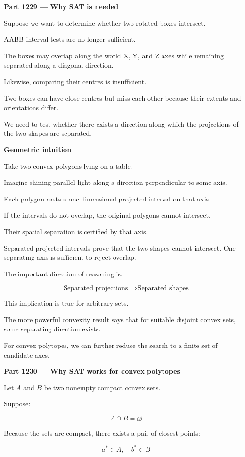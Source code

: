 \textbf{Part 1229 --- Why SAT is needed}

Suppose we want to determine whether two rotated boxes intersect.

AABB interval tests are no longer sufficient.

The boxes may overlap along the world X, Y, and Z axes while remaining separated along a diagonal direction.

Likewise, comparing their centres is insufficient.

Two boxes can have close centres but miss each other because their extents and orientations differ.

We need to test whether there exists a direction along which the projections of the two shapes are separated.

\textbf{Geometric intuition}

Take two convex polygons lying on a table.

Imagine shining parallel light along a direction perpendicular to some axis.

Each polygon casts a one-dimensional projected interval on that axis.

If the intervals do not overlap, the original polygons cannot intersect.

Their spatial separation is certified by that axis.

Separated projected intervals prove that the two shapes cannot intersect. One separating axis is sufficient to reject overlap.

The important direction of reasoning is:

\[
\boxed{ \text{Separated projections} \implies \text{Separated shapes} }
\]

This implication is true for arbitrary sets.

The more powerful convexity result says that for suitable disjoint convex sets, some separating direction exists.

For convex polytopes, we can further reduce the search to a finite set of candidate axes.

\textbf{Part 1230 --- Why SAT works for convex polytopes}

Let \(A\) and \(B\) be two nonempty compact convex sets.

Suppose:

\[
A\cap B=\varnothing
\]

Because the sets are compact, there exists a pair of closest points:

\[
a^*\in A,\quad b^*\in B
\]


